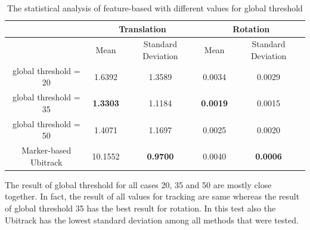 \begin{table}[H]
\centering
  \begin{tabular}{| c || c | c | c | c |}
      \hline
      & \multicolumn{2}{c|}{Translation} & \multicolumn{2}{c|}{Rotation} \\ \hline
       & Mean & Standard Deviation & Mean & Standard Deviation \\ \hline
      global threshold = 20 & 1.6392 & 1.3589 & 0.0034 & 0.0029 \\ \hline
      global threshold = 35 & \textbf{1.3303} & 1.1184 & \textbf{0.0019} & 0.0015 \\ \hline
      global threshold = 50 & 1.4071 & 1.1697 & 0.0025 & 0.0020 \\ \hline
      Marker-based Ubitrack & 10.1552 & \textbf{0.9700} & 0.0040 & \textbf{0.0006} \\ \hline
  \end{tabular}
  \caption{The statistical analysis of feature-based with different values for global threshold} \label{tab:test_global_threshold}
\end{table}
The result of global threshold for all cases 20, 35 and 50 are mostly close together. In fact, the result of all values for tracking are same whereas the result of global threshold 35 has the best result for rotation. In this test also the Ubitrack has the lowest standard deviation among all methods that were tested.

